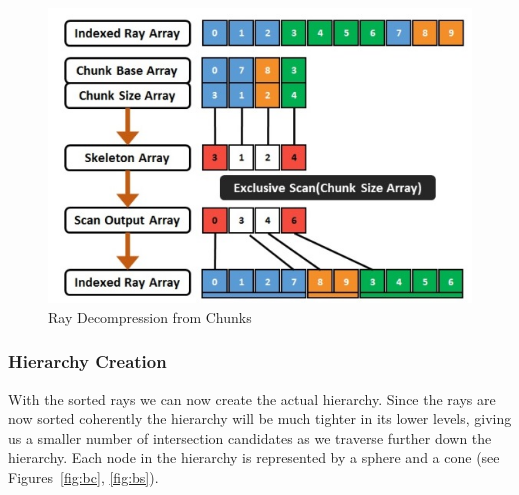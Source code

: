 \documentclass{egpubl}
\begin{document}
\begin{figure}[!htb]
    \centering
    \includegraphics[scale=0.50]{Images/Ray_Decompression.jpg}
    \caption{Ray Decompression from Chunks}
\end{figure}

\subsubsection{Hierarchy Creation}

With the sorted rays we can now create the actual hierarchy. Since the rays are now sorted coherently the hierarchy will be much tighter in its lower levels, giving us a smaller number of intersection candidates as we traverse further down the hierarchy.
Each node in the hierarchy is represented by a sphere and a cone (see Figures~\ref{fig:bc}, \ref{fig:bs}).
\end{document}
